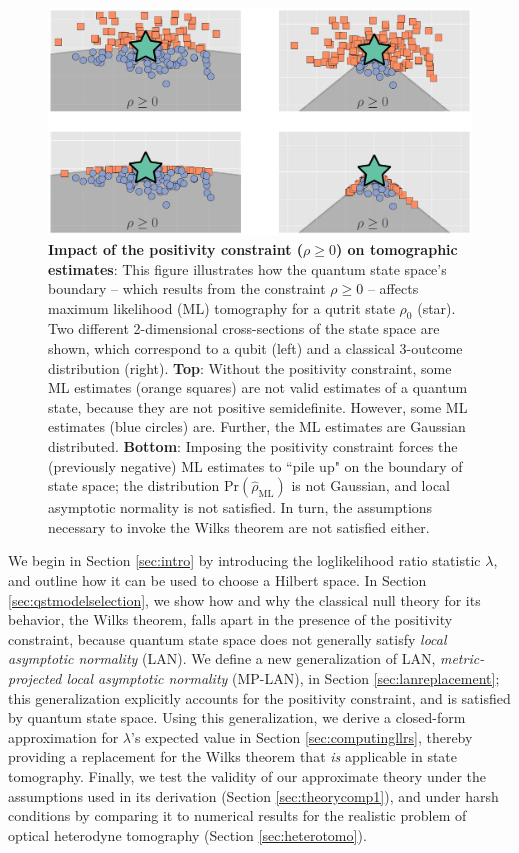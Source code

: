\documentclass[aps,pra, twocolumn]{revtex4-1}
\begin{document}
\begin{figure}
\includegraphics[width=\columnwidth]{Images/Figure_1.pdf}
 \caption{\textbf{Impact of the positivity constraint ($\rho\geq0$)  on tomographic estimates}:  This figure illustrates how the quantum state space's boundary -- which results from the constraint $\rho\geq0$ -- affects maximum likelihood (ML) tomography for a qutrit state $\rho_{0}$ (star).  Two different 2-dimensional cross-sections of the state space are shown, which correspond to a qubit (left) and a classical 3-outcome distribution (right). \textbf{Top}: Without the positivity constraint, some ML estimates (orange squares) are not valid estimates of a quantum state, because they are not positive semidefinite. However, some ML estimates (blue circles) are. Further, the ML estimates are Gaussian distributed.
\textbf{Bottom}:  Imposing the positivity constraint forces the (previously negative) ML estimates to ``pile up" on the boundary of state space; the distribution $\mathrm{Pr}(\hat{\rho}_{\mathrm{ML}})$ is not Gaussian, and local asymptotic normality is not satisfied. In turn, the assumptions necessary to invoke the Wilks theorem are not satisfied either.}
\label{fig:boundaries}
\end{figure}

We begin in Section \ref{sec:intro} by introducing the loglikelihood ratio statistic $\lambda$, and outline how it can be used to choose a Hilbert space.  In Section \ref{sec:qstmodelselection}, we show how and why the classical null theory for its behavior, the Wilks theorem, falls apart in the presence of the positivity constraint, because quantum state space does not generally satisfy \emph{local asymptotic normality} (LAN).  We define a new generalization of LAN, \emph{metric-projected local asymptotic normality} (MP-LAN), in Section \ref{sec:lanreplacement}; this generalization explicitly accounts for the positivity constraint, and is satisfied by quantum state space. Using this generalization, we derive a closed-form approximation for $\lambda$'s expected value in Section \ref{sec:computingllrs}, thereby providing a replacement for the Wilks theorem that \emph{is} applicable in state tomography.  Finally, we test the validity of our approximate theory under the assumptions used in its derivation (Section \ref{sec:theorycomp1}), and under harsh conditions by comparing it to numerical results for the realistic problem of optical heterodyne tomography (Section \ref{sec:heterotomo}).
\end{document}
